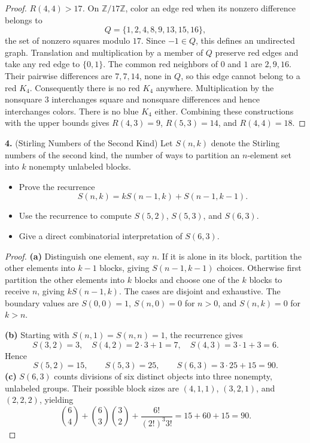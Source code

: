 \documentclass[12pt]{amsart}
\begin{document}
\begin{onehalfspace}
\begin{proof}
            \emph{$R(4,4)>17$.} On $\mathbb Z/17\mathbb Z$, color an edge
            red when its nonzero difference belongs to
            \[
                Q=\{1,2,4,8,9,13,15,16\},
            \]
            the set of nonzero squares modulo $17$. Since $-1\in Q$, this
            defines an undirected graph. Translation and multiplication
            by a member of $Q$ preserve red edges and take any red edge
            to $\{0,1\}$. The common red neighbors of $0$ and $1$ are
            $2,9,16$. Their pairwise differences are $7,7,14$, none in
            $Q$, so this edge cannot belong to a red $K_4$. Consequently
            there is no red $K_4$ anywhere. Multiplication by the nonsquare
            $3$ interchanges square and nonsquare differences and hence
            interchanges colors. There is no blue $K_4$ either.
            Combining these constructions with the upper bounds gives
            $R(4,3)=9$, $R(5,3)=14$, and $R(4,4)=18$.
        \end{proof}

        \noindent\textbf{4.} (Stirling Numbers of the Second Kind) Let $S(n,k)$ denote the Stirling
        numbers of the second kind, the number of ways to partition an $n$-element set into $k$
        nonempty unlabeled blocks.
        \begin{itemize}
            \item[(a)] Prove the recurrence
            \[
                S(n,k) = kS(n-1,k) + S(n-1,k-1).
            \]
            \item[(b)] Use the recurrence to compute $S(5,2)$, $S(5,3)$, and $S(6,3)$.
            \item[(c)] Give a direct combinatorial interpretation of $S(6,3)$.
        \end{itemize}

        \begin{proof}
            \textbf{(a)} Distinguish one element, say $n$. If it is alone
            in its block, partition the other elements into $k-1$ blocks,
            giving $S(n-1,k-1)$ choices. Otherwise first partition the other
            elements into $k$ blocks and choose one of the $k$ blocks to
            receive $n$, giving $kS(n-1,k)$. The cases are disjoint and
            exhaustive. The boundary values are $S(0,0)=1$,
            $S(n,0)=0$ for $n>0$, and $S(n,k)=0$ for $k>n$.

            \textbf{(b)} Starting with $S(n,1)=S(n,n)=1$, the recurrence gives
            \[
                S(3,2)=3,\quad S(4,2)=2\cdot3+1=7,
                \quad S(4,3)=3\cdot1+3=6.
            \]
            Hence
            \[
                S(5,2)=15,\qquad S(5,3)=25,\qquad
                S(6,3)=3\cdot25+15=90.
            \]
            \textbf{(c)} $S(6,3)$ counts divisions of six distinct objects
            into three nonempty, unlabeled groups. Their possible block
            sizes are $(4,1,1)$, $(3,2,1)$, and $(2,2,2)$, yielding
            \[
                \binom64+\binom63\binom32+
                \frac{6!}{(2!)^3 3!}=15+60+15=90.
            \]
        \end{proof}


\end{onehalfspace}
\end{document}
